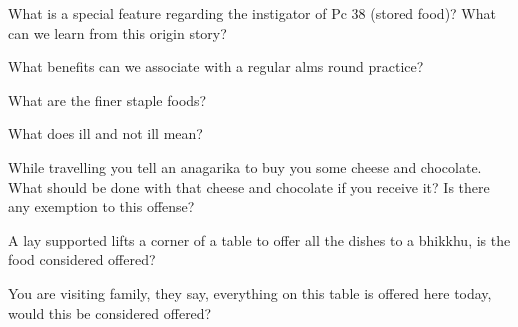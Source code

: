 What is a special feature regarding the instigator of Pc 38 (stored food)? What
can we learn from this origin story?


\bigskip

What benefits can we associate with a regular alms round practice?


\bigskip

What are the finer staple foods?


\bigskip

What does ill and not ill mean?


\bigskip

While travelling you tell an anagarika to buy you some cheese and chocolate.
What should be done with that cheese and chocolate if you receive it? Is there
any exemption to this offense?


\bigskip


A lay supported lifts a corner of a table to offer all the dishes to a bhikkhu,
is the food considered offered?

\bigskip

You are visiting family, they say, everything on this table is offered here
today, would this be considered offered?


